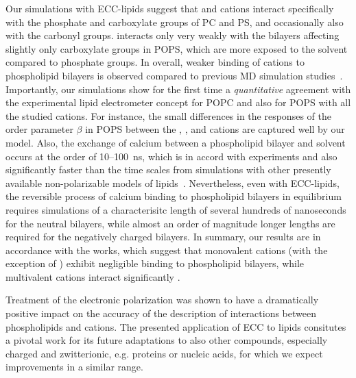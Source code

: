 Our simulations with ECC-lipids suggest that
 and  cations
interact specifically with the phosphate and carboxylate groups of PC and PS, 
and occasionally also with the carbonyl groups. 
 interacts only very weakly with the bilayers
affecting slightly only carboxylate groups in POPS,
which are more exposed to the solvent compared to phosphate groups. 
In overall, weaker binding of cations to phospholipid bilayers is observed 
compared to previous MD simulation studies~\citep{nmrlipids_proj4, catte16, bockmann03, bockmann04, melcrova16, javanainen17}. 
Importantly,
our simulations show for the first time a \emph{quantitative} agreement with the experimental lipid electrometer concept
for POPC and also for POPS with all the studied cations. 
For instance, the small differences 
in the responses of the order parameter $\beta$ in POPS
between the 
, , and  cations
are captured well by our model. 
Also, the exchange of calcium between a phospholipid bilayer and solvent 
occurs at the order of 10--100~ns, 
which is in accord with experiments and also 
significantly faster than the time scales from simulations 
with other presently available non-polarizable models of lipids~\citep{melcrova16, javanainen17, catte16}. 
Nevertheless, even with ECC-lipids,
the reversible process of calcium binding to phospholipid bilayers in equilibrium
requires simulations of a characterisitc length of several hundreds of nanoseconds 
for the neutral bilayers,
while almost an order of magnitude longer lengths 
are required for the negatively charged bilayers. 
In summary,
our results are in accordance with the works,
which suggest that monovalent cations (with the exception of ) 
exhibit negligible binding to phospholipid bilayers, 
while multivalent cations interact significantly 
\citep{cevc90,tocanne90, hauser76,hauser78,herbette84,altenbach84,clarke99,binder02,pabst07,uhrikova08,filippov09}.


Treatment  of the electronic polarization 
was shown to have a dramatically positive impact on the accuracy of the description of interactions
between phospholipids and cations. 
The presented application of ECC to lipids
consitutes a pivotal work for its future adaptations 
to also other compounds, especially charged and zwitterionic, 
e.g. proteins or nucleic acids,
for which we expect improvements in a similar range. 

